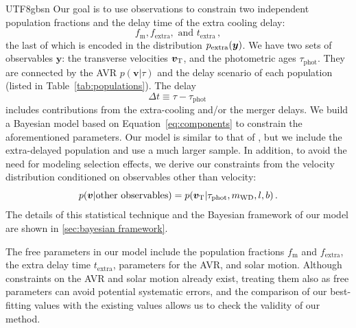 \documentclass[twocolumn, times, trackchanges]{aastex63_bren}
\newcommand{\mathbfit}{\bm}
\newcommand{\bvT}{\mathbfit{v}_{\rm T}}
\begin{document}
\begin{CJK*}{UTF8}{gbsn}
Our goal is to use observations to constrain two independent population fractions and the delay time of the extra cooling delay:
\begin{equation}
    f_\text{m}, f_\text{extra}, \text{ and }t_\text{extra}\,,
\end{equation}
the last of which is encoded in the distribution $p_{\rm extra}(\mathbfit{y})$.
We have two sets of observables $\mathbfit{y}$: the transverse velocities $\mathbfit{v}_{\rm T}$, and the photometric ages $\tau_\text{phot}$. They are connected by the AVR $p(\mathbfit{v}|\tau)$ and the delay scenario of each population (listed in Table~\ref{tab:populations}). The delay
\begin{equation}
\label{eq:tau}
    \Delta t \equiv \tau - \tau_\text{phot}\,
\end{equation}
includes contributions from the extra-cooling and/or the merger delays. We build a Bayesian model based on Equation~\ref{eq:components} to constrain the aforementioned parameters.
Our model is similar to that of \citet{Wegg_2012}, but we include the extra-delayed population and use a much larger sample. In addition, to avoid the need for modeling selection effects, we derive our constraints from the velocity distribution conditioned on observables other than velocity:
\begin{equation}
\label{eq:conditional PDF}
    p(\mathbfit{v}|\text{other observables}) = p(\bvT|\tau_\text{phot},m_\text{WD},l,b)\,.
\end{equation}
The details of this statistical technique and the Bayesian framework of our model are shown in \ref{sec:bayesian framework}.

The free parameters in our model include the population fractions $f_\text{m}$ and $f_\text{extra}$, the extra delay time $t_\text{extra}$, parameters for the AVR, and solar motion. Although constraints on the AVR and solar motion already exist, treating them also as free parameters can avoid potential systematic errors, and the comparison of our best-fitting values with the existing values allows us to check the validity of our method.


\end{CJK*}
\end{document}
